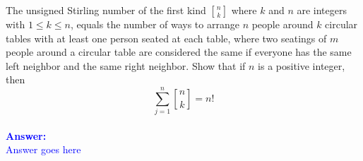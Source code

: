 \item{}
The unsigned Stirling number of the first kind ${n \brack k}$ where $k$ and $n$
are integers with $1 \le k \le n$, equals the number of ways to arrange $n$
people around $k$ circular tables with at least one person seated at each
table, where two seatings of $m$ people around a circular table are considered
the same if everyone has the same left neighbor and the same right neighbor.
\parend
Show that if $n$ is a positive integer, then $$\sum_{j=1}^n{n\brack k}=n!$$
\\[12pt]
\ifanswers
\textcolor{blue}{
\textbf{Answer:}\\[6pt]
Answer goes here
}
\newpage
\fi
